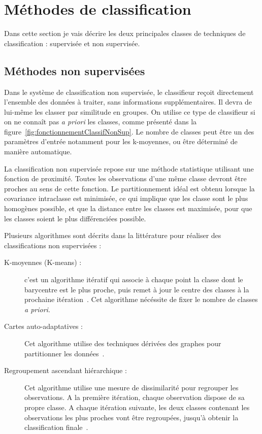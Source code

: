 	\section{Méthodes de classification}

Dans cette section je vais décrire les deux principales classes de techniques de classification : supervisée et non supervisée.


		\subsection{Méthodes non supervisées}

Dans le système de classification non supervisée, le classifieur reçoit directement l'ensemble des données à traiter, sans informations supplémentaires. Il devra de lui-même les classer par similitude en groupes. On utilise ce type de classifieur si on ne connaît pas \textit{a priori} les classes, comme présenté dans la figure~\ref{fig:fonctionnementClassifNonSup}. Le nombre de classes peut être un des paramètres d'entrée notamment pour les k-moyennes, ou être déterminé de manière automatique.


La classification non supervisée repose sur une méthode statistique utilisant une fonction de proximité. Toutes les observations d'une même classe devront être proches au sens de cette fonction. Le partitionnement idéal est obtenu lorsque la covariance intraclasse est minimisée, ce qui implique que les classe sont le plus homogènes possible, et que la distance entre les classes est maximisée, pour que les classes soient le plus différenciées possible.

Plusieurs algorithmes sont décrits dans la littérature pour réaliser des classifications non supervisées :

\begin{description}
 \item[K-moyennes (K-means) : ]  c'est un algorithme itératif qui associe à chaque point la classe dont le barycentre est le plus proche, puis remet à jour le centre des classes à la prochaine itération~\cite{herwig1999large}. Cet algorithme nécéssite de fixer le nombre de classes \textit{a priori}.
 \item[Cartes auto-adaptatives : ] Cet algorithme utilise des techniques dérivées des graphes pour partitionner les données~\cite{kohonen1982self}.
 \item[Regroupement ascendant hiérarchique : ] Cet algorithme utilise une mesure de dissimilarité pour regrouper les observations. A la première itération, chaque observation dispose de sa propre classe. A chaque itération suivante, les deux classes contenant les observations les plus proches vont être regroupées, jusqu'à obtenir la classification finale~\cite{ward1963hierarchical}.
\end{description}


